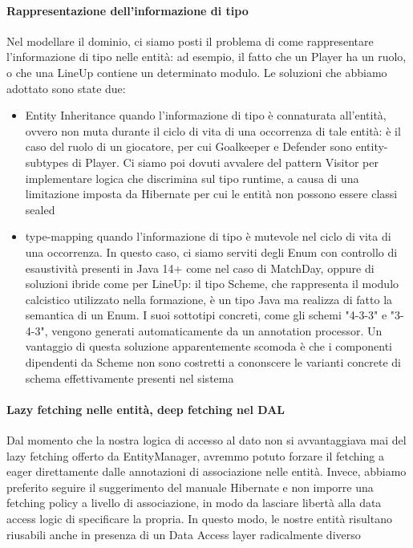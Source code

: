 \paragraph{Rappresentazione dell'informazione di tipo}
Nel modellare il dominio, ci siamo posti il problema di come rappresentare l'informazione di tipo nelle entità: ad esempio, il fatto che un Player ha un ruolo, o che una LineUp contiene un determinato modulo. Le soluzioni che abbiamo adottato sono state due:
\begin{itemize}
    \item Entity Inheritance quando l'informazione di tipo è connaturata all'entità, ovvero non muta durante il ciclo di vita di una occorrenza di tale entità: è il caso del ruolo di un giocatore, per cui Goalkeeper e Defender sono entity-subtypes di Player. Ci siamo poi dovuti avvalere del pattern Visitor per implementare logica che discrimina sul tipo runtime, a causa di una limitazione imposta da Hibernate per cui le entità non possono essere classi sealed
    \item type-mapping quando l'informazione di tipo è mutevole nel ciclo di vita di una occorrenza. In questo caso, ci siamo serviti degli Enum con controllo di esaustività presenti in Java 14+ come nel caso di MatchDay,
    oppure di soluzioni ibride come per LineUp: il tipo Scheme, che rappresenta
    il modulo calcistico utilizzato nella formazione, è un tipo Java ma realizza di fatto la semantica di un Enum. I suoi sottotipi concreti, come gli schemi "4-3-3" e "3-4-3", vengono generati automaticamente da un annotation processor. Un vantaggio di questa soluzione apparentemente scomoda è che i componenti dipendenti da Scheme non sono costretti a cononscere le varianti concrete di schema effettivamente presenti nel sistema
\end{itemize}

\paragraph{Lazy fetching nelle entità, deep fetching nel DAL}
Dal momento che la nostra logica di accesso al dato non si avvantaggiava mai
del lazy fetching offerto da EntityManager, avremmo potuto forzare il fetching
a eager direttamente dalle annotazioni di associazione nelle entità. Invece,
abbiamo preferito seguire il suggerimento del manuale Hibernate e non imporre una fetching policy a livello di associazione, in modo da lasciare libertà alla
data access logic di specificare la propria. In questo modo, le nostre entità
risultano riusabili anche in presenza di un Data Access layer radicalmente diverso


